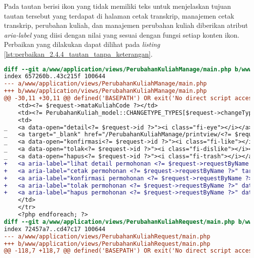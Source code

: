 Pada tautan berisi ikon yang tidak memiliki teks untuk menjelaskan tujuan tautan tersebut yang terdapat di halaman cetak transkrip, manajemen cetak transkrip, perubahan kuliah, dan manajemen perubahan kuliah diberikan atribut \textit{aria-label} yang diisi dengan nilai yang sesuai dengan fungsi setiap konten ikon. Perbaikan yang dilakukan dapat dilihat pada \textit{listing} \ref{lst:perbaikan_2.4.4_tautan_tanpa_keterangan}.
\begin{lstlisting}[frame=single, label={lst:perbaikan_2.4.4_tautan_tanpa_keterangan}, language=diff, caption=Perbaikan Kriteria Sukses 2.4.4]
diff --git a/www/application/views/PerubahanKuliahManage/main.php b/www/application/views/PerubahanKuliahManage/main.php
index 657260b..43c215f 100644
--- a/www/application/views/PerubahanKuliahManage/main.php
+++ b/www/application/views/PerubahanKuliahManage/main.php
@@ -30,11 +30,11 @@ defined('BASEPATH') OR exit('No direct script access allowed');
    <td><?= $request->mataKuliahCode ?></td>
    <td><?= PerubahanKuliah_model::CHANGETYPE_TYPES[$request->changeType] ?></td>
    <td>
_   <a data-open="detail<?= $request->id ?>"><i class="fi-eye"></i></a>
_   <a target="_blank" href="/PerubahanKuliahManage/printview/<?= $request->id ?>"><i class="fi-print"></i></a>
_   <a data-open="konfirmasi<?= $request->id ?>"><i class="fi-like"></i></a>                                    
_   <a data-open="tolak<?= $request->id ?>"><i class="fi-dislike"></i></a>
_   <a data-open="hapus<?= $request->id ?>"><i class="fi-trash"></i></a>
+   <a aria-label="lihat detail permohonan <?= $request->requestByName ?>" data-open="detail<?= $request->id ?>"><i class="fi-eye"></i></a>
+   <a aria-label="cetak permohonan <?= $request->requestByName ?>" target="_blank" href="/PerubahanKuliahManage/printview/<?= $request->id ?>"><i class="fi-print"></i></a>
+   <a aria-label="konfirmasi permohonan <?= $request->requestByName ?>" data-open="konfirmasi<?= $request->id ?>"><i class="fi-like"></i></a>
+   <a aria-label="tolak permohonan <?= $request->requestByName ?>" data-open="tolak<?= $request->id ?>"><i class="fi-dislike"></i></a>
+   <a aria-label="hapus permohonan <?= $request->requestByName ?>" data-open="hapus<?= $request->id ?>"><i class="fi-trash"></i></a>
    </td>
    </tr>
    <?php endforeach; ?>
diff --git a/www/application/views/PerubahanKuliahRequest/main.php b/www/application/views/PerubahanKuliahRequest/main.php
index 72457a7..cd47c17 100644
--- a/www/application/views/PerubahanKuliahRequest/main.php
+++ b/www/application/views/PerubahanKuliahRequest/main.php
@@ -118,7 +118,7 @@ defined('BASEPATH') OR exit('No direct script access allowed');

\end{lstlisting}
